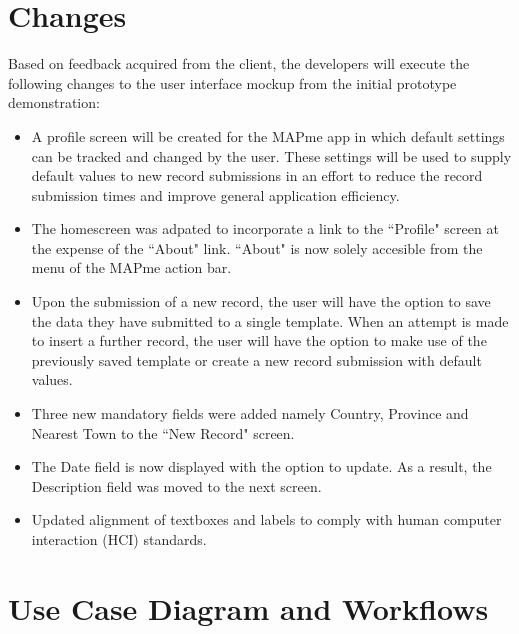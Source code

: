 \documentclass[12pt,a4paper,oneside]{report}
\begin{document}
\section{Changes}
	Based on feedback acquired from the client, the developers will execute the following changes to the user interface mockup from the initial prototype demonstration:
\begin{itemize}
	\item A profile screen will be created for the MAPme app in which default settings can be tracked and changed by the user.  These settings will be used to supply default values to new record submissions in an effort to reduce the record submission times and improve general application efficiency.
	\item The homescreen was adpated to incorporate a link to the  ``Profile" screen at the expense of the ``About" link. ``About" is now solely accesible from the menu of the MAPme action bar.
	\item Upon the submission of a new record, the user will have the option to save the data they have submitted to a single template.  When an attempt is made to insert a further record, the user will have the option to make use of the previously saved template or create a new record submission with default values.
	\item Three new mandatory fields were added namely Country, Province and Nearest Town to the ``New Record" screen.
	\item The Date field is now displayed with the option to update. As a result, the Description field was moved to the next screen.
	\item Updated alignment of textboxes and labels to comply with human computer interaction (HCI) standards.
\end{itemize}

\section{Use Case Diagram and Workflows}
\end{document}
